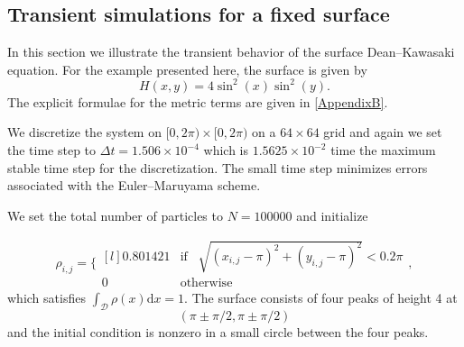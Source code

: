 \documentclass[11pt, a4paper]{article}
\newcommand{\mathd}{\mathrm{d}}
\begin{document}
\subsection{Transient simulations for a fixed surface}\label{sec:trans}

In this section we illustrate the transient behavior of the surface Dean--Kawasaki equation.
For the example presented here, the surface is given by
\[
H(x,y) = 4 \sin^2(x) \sin^2(y).
\]
The explicit formulae for the metric terms are given in \ref{AppendixB}.

We discretize the system on $[0,2\pi)\times[0,2\pi)$ on a $64 \times 64$ grid and again we
set the time step to $\Delta t = 1.506 \times 10^{-4}$ which is $1.5625\times 10^{-2}$ time the maximum stable time step for the discretization.  The small time step minimizes errors associated with the Euler--Maruyama scheme. 

We set the total number of particles to $N = 100000$ and initialize

\[
\rho_{i,j}= \Biggl\{ 
\begin{matrix*}[l]
   0.801421 & \mathrm{if} \;\;\; \sqrt{(x_{i,j}-\pi)^2+(y_{i,j}-\pi)^2} < 0.2 \pi
    \\[.1cm]
    0 & \mathrm{otherwise} 
\end{matrix*},
\]
which satisfies $\int_{\mathcal{D}} \rho(x) \mathd x = 1$.
The surface consists of four peaks of height 4 at 
\[(\pi\pm \pi/2, \pi\pm \pi/2)\]
and the initial condition is nonzero in a small circle between the four peaks.
\end{document}

